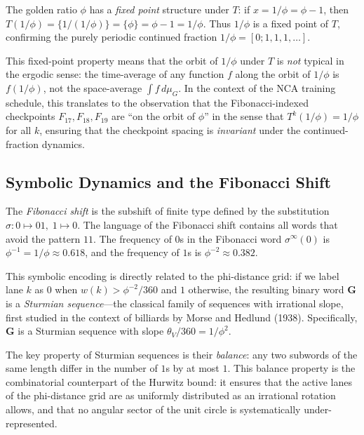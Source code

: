 The golden ratio $\phi$ has a \emph{fixed point}
structure under $T$: if $x = 1/\phi = \phi - 1$,
then $T(1/\phi) = \{1/(1/\phi)\} = \{\phi\} = \phi - 1 = 1/\phi$.
Thus $1/\phi$ is a fixed point of $T$, confirming
the purely periodic continued fraction
$1/\phi = [0; 1, 1, 1, \ldots]$.

This fixed-point property means that the orbit of
$1/\phi$ under $T$ is \emph{not} typical in the
ergodic sense: the time-average of any function
$f$ along the orbit of $1/\phi$ is $f(1/\phi)$,
not the space-average $\int f\,d\mu_G$.  In the
context of the NCA training schedule, this
translates to the observation that the
Fibonacci-indexed checkpoints $F_{17}, F_{18}, F_{19}$
are ``on the orbit of $\phi$'' in the sense that
$T^k(1/\phi) = 1/\phi$ for all $k$, ensuring
that the checkpoint spacing is \emph{invariant}
under the continued-fraction dynamics.

\subsection{Symbolic Dynamics and the Fibonacci Shift}
\label{subsec:fibonacci-shift}

The \emph{Fibonacci shift} is the subshift of
finite type defined by the substitution
$\sigma: 0 \mapsto 01,\; 1 \mapsto 0$.
The language of the Fibonacci shift contains all
words that avoid the pattern $11$.  The frequency
of $0$s in the Fibonacci word $\sigma^\infty(0)$
is $\phi^{-1} = 1/\phi \approx 0.618$, and the
frequency of $1$s is $\phi^{-2} \approx 0.382$.

This symbolic encoding is directly related to the
phi-distance grid: if we label lane $k$ as
$0$ when $w(k) > \phi^{-2}/360$ and $1$ otherwise,
the resulting binary word $\mathbf{G}$ is a
\emph{Sturmian sequence}---the classical
family of sequences with irrational slope, first
studied in the context of billiards by Morse and
Hedlund (1938).  Specifically, $\mathbf{G}$
is a Sturmian sequence with slope $\theta_V/360 = 1/\phi^2$.

The key property of Sturmian sequences is their
\emph{balance}: any two subwords of the same
length differ in the number of $1$s by at most $1$.
This balance property is the combinatorial
counterpart of the Hurwitz bound: it ensures
that the active lanes of the phi-distance grid
are as uniformly distributed as an irrational
rotation allows, and that no angular sector of
the unit circle is systematically under-represented.

